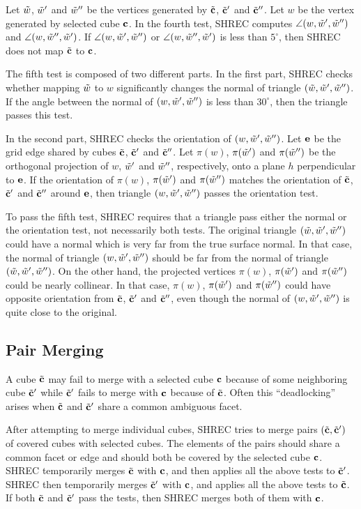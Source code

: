 Let $\tilde{w}$, $\tilde{w}'$ and $\tilde{w}''$ be the vertices generated
by ${\tilde{\mathbf{c}}}$, ${\tilde{\mathbf{c}}}'$ and ${\tilde{\mathbf{c}}}''$.
Let $w$ be the vertex generated by selected cube $\mathbf{c}$.
In the fourth test,
SHREC computes $\angle(w,\tilde{w}',\tilde{w}'')$ and $\angle(w,\tilde{w}'',\tilde{w}')$.
If $\angle(w,\tilde{w}',\tilde{w}'')$ or $\angle(w,\tilde{w}'',\tilde{w}')$ is less than $5^\circ$,
then SHREC does not map ${\tilde{\mathbf{c}}}$ to $\mathbf{c}$.

The fifth test is composed of two different parts.
In the first part,
SHREC checks whether mapping $\tilde{w}$ to $w$
significantly changes the normal of triangle $(\tilde{w},\tilde{w}',\tilde{w}'')$.
If the angle between the normal of $(w, \tilde{w}', \tilde{w}'')$ is less than $30^\circ$,
then the triangle passes this test.

In the second part, SHREC checks the orientation of $(w, \tilde{w}', \tilde{w}'')$.
Let $\mathbf{e}$ be the grid edge shared by cubes ${\tilde{\mathbf{c}}}$, ${\tilde{\mathbf{c}}}'$ and ${\tilde{\mathbf{c}}}''$.
Let $\pi(w)$, $\pi(\tilde{w}')$ and $\pi(\tilde{w}'')$ be the orthogonal projection
of $w$, $\tilde{w}'$ and $\tilde{w}''$, respectively, 
onto a plane $h$ perpendicular to $\mathbf{e}$.
If the orientation of $\pi(w)$, $\pi(\tilde{w}')$ and $\pi(\tilde{w}'')$
matches the orientation of ${\tilde{\mathbf{c}}}$, ${\tilde{\mathbf{c}}}'$ and ${\tilde{\mathbf{c}}}''$ around $\mathbf{e}$,
then triangle $(w,\tilde{w}',\tilde{w}'')$ passes the orientation test.

To pass the fifth test,
SHREC requires that a triangle pass either the normal or the orientation test,
not necessarily both tests.
The original triangle $(\tilde{w},\tilde{w}',\tilde{w}'')$ could have a normal which
is very far from the true surface normal.
In that case, the normal of triangle $(w, \tilde{w}', \tilde{w}'')$ should
be far from the normal of triangle $(\tilde{w}, \tilde{w}', \tilde{w}'')$.
On the other hand,
the projected vertices $\pi(w)$, $\pi(\tilde{w}')$ and $\pi(\tilde{w}'')$
could be nearly collinear.
In that case, $\pi(w)$, $\pi(\tilde{w}')$ and $\pi(\tilde{w}'')$ could have
opposite orientation from ${\tilde{\mathbf{c}}}$, ${\tilde{\mathbf{c}}}'$ and ${\tilde{\mathbf{c}}}''$,
even though the normal of $(w,\tilde{w}',\tilde{w}'')$ is quite close
to the original.


\subsection{Pair Merging}
\label{section:pair_merging}

A cube ${\tilde{\mathbf{c}}}$ may fail to merge with a selected cube $\mathbf{c}$
because of some neighboring cube ${\tilde{\mathbf{c}}}'$
while ${\tilde{\mathbf{c}}}'$ fails to merge with $\mathbf{c}$ because of ${\tilde{\mathbf{c}}}$.
Often this ``deadlocking'' arises when ${\tilde{\mathbf{c}}}$ and ${\tilde{\mathbf{c}}}'$ share
a common ambiguous facet.

After attempting to merge individual cubes,
SHREC tries to merge pairs $({\tilde{\mathbf{c}}},{\tilde{\mathbf{c}}}')$ of covered cubes with selected cubes.
The elements of the pairs should share a common facet or edge
and should both be covered by the selected cube $\mathbf{c}$.
SHREC temporarily merges ${\tilde{\mathbf{c}}}$ with $\mathbf{c}$,
and then applies all the above tests to ${\tilde{\mathbf{c}}}'$.
SHREC then temporarily merges ${\tilde{\mathbf{c}}}'$ with $\mathbf{c}$,
and applies all the above tests to ${\tilde{\mathbf{c}}}$.
If both ${\tilde{\mathbf{c}}}$ and ${\tilde{\mathbf{c}}}'$ pass the tests,
then SHREC merges both of them with $\mathbf{c}$.

